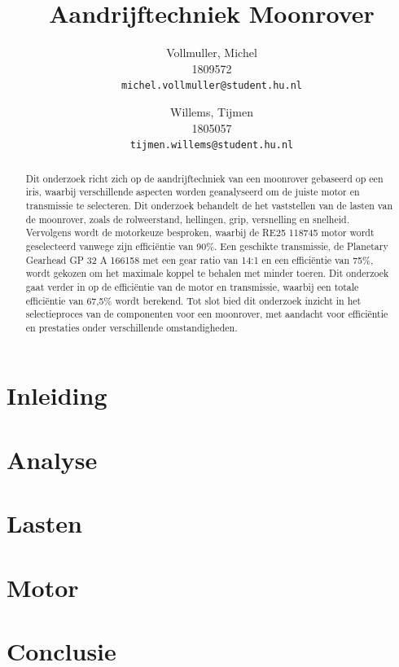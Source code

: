 \documentclass{article}
\title{Aandrijftechniek Moonrover}
\author{
  Vollmuller, Michel\\
  1809572\\
  \texttt{michel.vollmuller@student.hu.nl}
  \and
  Willems, Tijmen\\
  1805057\\
  \texttt{tijmen.willems@student.hu.nl}
}
\begin{document}
\maketitle

\begin{abstract}
  Dit onderzoek richt zich op de aandrijftechniek van een moonrover gebaseerd op een iris, waarbij verschillende aspecten worden geanalyseerd om de juiste motor en transmissie te selecteren. Dit onderzoek behandelt de het vaststellen van de lasten van de moonrover, zoals de rolweerstand, hellingen, grip, versnelling en snelheid. Vervolgens wordt de motorkeuze besproken, waarbij de RE25 118745 motor wordt geselecteerd vanwege zijn efficiëntie van 90\%. Een geschikte transmissie, de Planetary Gearhead GP 32 A 166158 met een gear ratio van 14:1 en een efficiëntie van 75\%, wordt gekozen om het maximale koppel te behalen met minder toeren. Dit onderzoek gaat verder in op de efficiëntie van de motor en transmissie, waarbij een totale efficiëntie van 67,5\% wordt berekend. Tot slot bied dit onderzoek inzicht in het selectieproces van de componenten voor een moonrover, met aandacht voor efficiëntie en prestaties onder verschillende omstandigheden.
\end{abstract}

\tableofcontents

\newpage

\section{Inleiding}


\section{Analyse} 


\newpage

\section{Lasten}


\newpage

\section{Motor}


\newpage

\section*{Conclusie}

\end{document}

